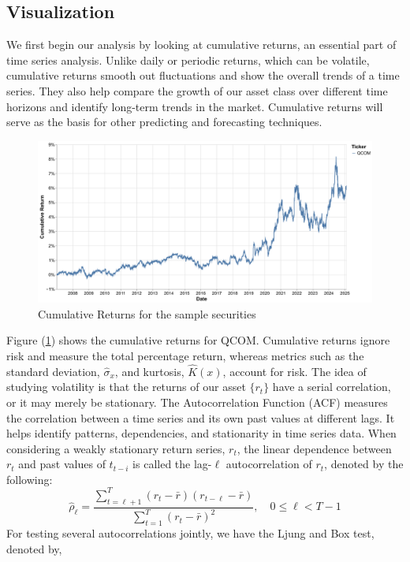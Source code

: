 \documentclass[12pt]{article}
\begin{document}
\subsection{Visualization}
We first begin our analysis by looking at cumulative returns, an essential part of time series analysis. Unlike daily or periodic returns, which can be volatile, cumulative returns smooth out fluctuations and show the overall trends of a time series. They also help compare the growth of our asset class over different time horizons and identify long-term trends in the market. Cumulative returns will serve as the basis for other predicting and forecasting techniques.
\begin{figure}[h]
	\centering
	\includegraphics[width=0.9\linewidth]{plots/cumulative_returns_qcom}
	\caption{Cumulative Returns for the sample securities}
	\label{fig:cum_returns}
\end{figure}
Figure (\ref{fig:cum_returns}) shows the cumulative returns for QCOM. Cumulative returns ignore risk and measure the total percentage return, whereas metrics such as the standard deviation, $\hat{\sigma}_x$, and kurtosis, $\hat{K}(x)$, account for risk. The idea of studying volatility is that the returns of our asset $\lbrace r_t\rbrace$ have a serial correlation, or it may merely be stationary. The Autocorrelation Function (ACF) measures the correlation between a time series and its own past values at different lags. It helps identify patterns, dependencies, and stationarity in time series data. When considering a weakly stationary return series, $r_t$, the linear dependence between $r_t$ and past values of $t_{t-i}$ is called the lag-$\ell$ autocorrelation of $r_t$, denoted by the following:
\begin{equation}
	\hat{\rho}_\ell=\frac{\sum_{t=\ell+1}^{T}\left(r_t-\bar{r}\right)\left(r_{t-\ell}-\bar{r}\right)}{\sum_{t=1}^{T}\left(r_t-\bar{r}\right)^2},\quad 0\leq\ell<T-1
\end{equation}
For testing several autocorrelations jointly, we have the Ljung and Box test, denoted by,
\end{document}
